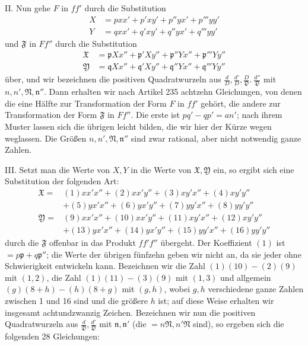 II. Nun gehe $F$ in $ff'$ durch die Substitution
\[
\begin{aligned}
X&=pxx'+p'xy'+p''yx'+p'''yy'\\
Y&=qxx'+q'xy'+q''yx'+q'''yy'
\end{aligned}
\]
und $\mathfrak{F}$ in $Ff''$ durch die Substitution
\[
\begin{aligned}
\mathfrak{X}&=\mathfrak{p}Xx''+\mathfrak{p}'Xy''+\mathfrak{p}''Yx''+\mathfrak{p}'''Yy''\\
\mathfrak{Y}&=\mathfrak{q}Xx''+\mathfrak{q}'Xy''+\mathfrak{q}''Yx''+\mathfrak{q}'''Yy''
\end{aligned}
\]
über, und wir bezeichnen die positiven Quadratwurzeln aus $\frac{d}{D},\frac{d'}{D},\frac{D}{\mathfrak{D}}.\ \frac{d''}{\mathfrak{D}}$ mit $n,n',\mathfrak{N},\mathfrak{n}''$. Dann erhalten wir nach Artikel 235 achtzehn Gleichungen, von denen die eine Hälfte zur Transformation der Form $F$ in $ff'$ gehört, die andere zur Transformation der Form $\mathfrak{F}$ in $Ff''$. Die erste ist $pq'-qp'=an'$; nach ihrem Muster lassen sich die übrigen leicht bilden, die wir hier der Kürze wegen weglassen. Die Größen $n,n',\mathfrak{N},\mathfrak{n}''$ sind zwar rational, aber nicht notwendig ganze Zahlen.

III. Setzt man die Werte von $X,Y$ in die Werte von $\mathfrak{X},\mathfrak{Y}$ ein, so ergibt sich eine Substitution der folgenden Art:
\[
\begin{aligned}
\mathfrak{X}={}&(1)xx'x''+(2)xx'y''+(3)xy'x''+(4)xy'y''\\
&+(5)yx'x''+(6)yx'y''+(7)yy'x''+(8)yy'y''\\
\mathfrak{Y}={}&(9)xx'x''+(10)xx'y''+(11)xy'x''+(12)xy'y''\\
&+(13)yx'x''+(14)yx'y''+(15)yy'x''+(16)yy'y''
\end{aligned}
\]
durch die $\mathfrak{F}$ offenbar in das Produkt $ff'f''$ übergeht. Der Koeffizient $(1)$ ist $=p\mathfrak{p}+q\mathfrak{p}''$; die Werte der übrigen fünfzehn geben wir nicht an, da sie jeder ohne Schwierigkeit entwickeln kann. Bezeichnen wir die Zahl $(1)(10)-(2)(9)$ mit $(1,2)$, die Zahl $(1)(11)-(3)(9)$ mit $(1,3)$ und allgemein $(g)(8+h)-(h)(8+g)$ mit $(g,h)$, wobei $g,h$ verschiedene ganze Zahlen zwischen 1 und 16 sind und die größere $h$ ist; auf diese Weise erhalten wir insgesamt achtundzwanzig Zeichen. Bezeichnen wir nun die positiven Quadratwurzeln aus $\frac{d}{\mathfrak{D}},\frac{d'}{\mathfrak{D}}$ mit $\mathfrak{n},\mathfrak{n}'$ (die $=n\mathfrak{N},n'\mathfrak{N}$ sind), so ergeben sich die folgenden 28 Gleichungen:

